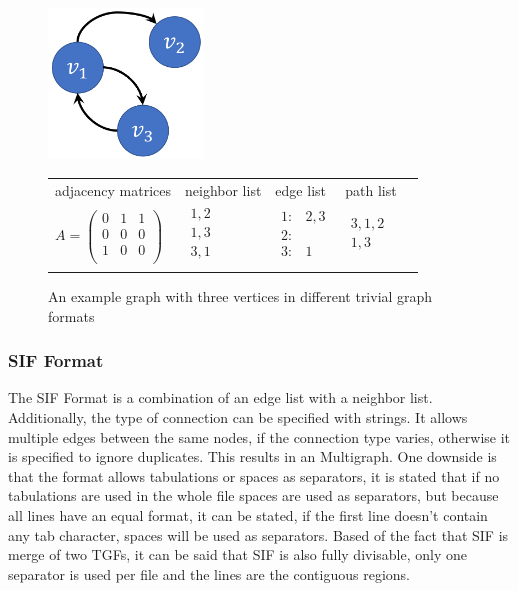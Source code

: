 \begin{figure}[H]
	\centering
	\includegraphics[height=4cm]{img/simple.png}
	\label{simple}
		\setlength{\tabcolsep}{0.5cm} %
		\begin{tabular}{lllll}
			\\
			adjacency matrices & neighbor list & edge list & path list \\
			$A = \left( \begin{array}{rrr}0 & 1 & 1 \\0 & 0 & 0 \\1 & 0 & 0\\\end{array}\right)$ &$\begin{array}{lll}1, 2\\1, 3\\3, 1\\\end{array}$ &$\begin{array}{lll}1: & 2,3 \\ 2: \\ 3: & 1\\\end{array}$ &$\begin{array}{lll}3,1,2 \\ 1,3 \\\end{array}$ \\
			
		\end{tabular}
	\caption{An example graph with three vertices in different trivial graph formats\cite{Roughan.10.03.2015}}
\end{figure}

		

\subsubsection{SIF Format}
The SIF Format is a combination of an edge list with a neighbor list. Additionally, the type of connection can be specified with strings. It allows multiple edges between the same nodes, if the connection type varies, otherwise it is specified to ignore duplicates. This results in an Multigraph. One downside is that the format allows tabulations or spaces as separators, it is stated that if no tabulations are used in the whole file spaces are used as separators, but because all lines have an equal format, it can be stated, if the first line doesn’t contain any tab character, spaces will be used as separators. Based of the fact that SIF is merge of two TGFs, it can be said that SIF is also fully divisable, only one separator is used per file and the lines are the contiguous regions. \cite{TheCytoscapeConsortium.2017}

